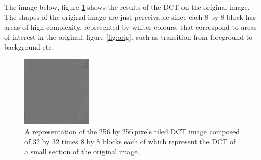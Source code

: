 The image below, figure \ref{fig:lena_DCT} shows the results of the DCT on the original image. The shapes of the original image are just perceivable since each 8 by 8 block has areas of high complexity, represented by whiter colours, that correspond to areas of interest in the original, figure \ref{fig:orig}, such as transition from foreground to background etc.
\begin{figure}[ht]
	\centering
	\includegraphics[width=0.3\textwidth]{DCT_lena.jpg}
	\caption{A representation of the 256 by 256\,pixels tiled DCT image composed of 32 by 32 times 8 by 8 blocks each of which represent the DCT of a small section of the original image.\label{fig:lena_DCT}}
\end{figure}
